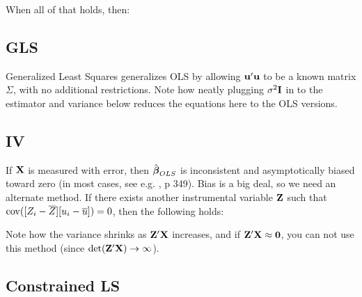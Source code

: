 When all of that holds, then:


\subsection{GLS} \label{GLS}
Generalized Least Squares generalizes OLS by allowing ${\bf u}'{\bf u}$ to be a
known matrix $\Sigma$, with no additional restrictions.
Note how neatly plugging $\sigma^2{\bf I}$ in to the
estimator and variance below reduces the equations here to the OLS
versions.


\subsection{IV}  
	\label{IV} 
If ${\bf X}$ is measured with error, then $\hat{{\mbox{\boldmath$\beta$}}}_{OLS}$ is inconsistent and
asymptotically biased toward zero (in most cases, see e.g. \cite{kmenta},
p 349). Bias is a big deal, so we need an alternate method. If there exists
another instrumental variable ${\bf Z}$ such that $\operatorname{cov}([Z_i-\overline
Z][u_i-\overline u])=0$, then the following holds:


Note how the variance shrinks as ${\bf Z}'{\bf X}$ increases, and if
${\bf Z}'{\bf X}\approx{\bf 0}$, you can not use this method (since
$\det({\bf Z}'{\bf X}) \to \infty$). 

\subsection{Constrained LS }
\label{constrainedls}

